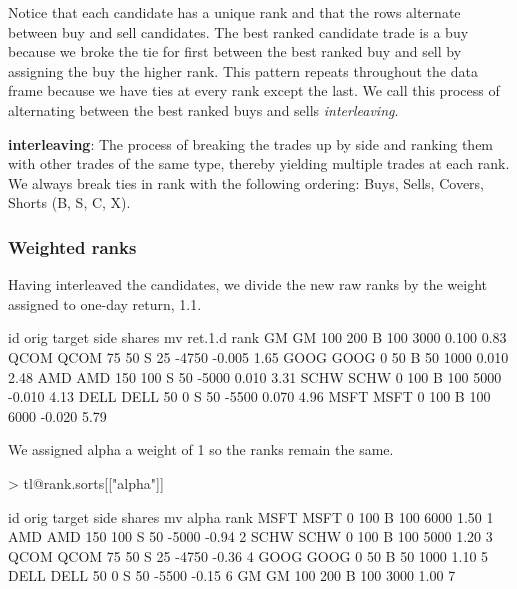 \documentclass{article}
\begin{document}
Notice that each candidate has a unique rank and that the rows
alternate between buy and sell candidates.  The best ranked candidate
trade is a buy because we broke the tie for first between the best
ranked buy and sell by assigning the buy the higher rank.  This
pattern repeats throughout the data frame because we have ties at
every rank except the last.  We call this process of alternating
between the best ranked buys and sells \emph{interleaving}.

\begin{description}

\item{\bf{interleaving}}: The process of breaking the trades up by
  side and ranking them with other trades of the same type, thereby
  yielding multiple trades at each rank.  We always break ties in rank
  with the following ordering: Buys, Sells, Covers, Shorts (B, S, C,
  X).

\end{description}

\subsubsection{Weighted ranks}
\label{lo weighted ranks}

Having interleaved the candidates, we divide the new raw ranks by the
weight assigned to one-day return, 1.1.

\begin{Schunk}
\begin{Soutput}
       id orig target side shares    mv ret.1.d rank
GM     GM  100    200    B    100  3000   0.100 0.83
QCOM QCOM   75     50    S     25 -4750  -0.005 1.65
GOOG GOOG    0     50    B     50  1000   0.010 2.48
AMD   AMD  150    100    S     50 -5000   0.010 3.31
SCHW SCHW    0    100    B    100  5000  -0.010 4.13
DELL DELL   50      0    S     50 -5500   0.070 4.96
MSFT MSFT    0    100    B    100  6000  -0.020 5.79
\end{Soutput}
\end{Schunk}

We assigned alpha a weight of 1 so the ranks remain the same.  

\begin{Schunk}
\begin{Sinput}
> tl@rank.sorts[["alpha"]]
\end{Sinput}
\begin{Soutput}
       id orig target side shares    mv alpha rank
MSFT MSFT    0    100    B    100  6000  1.50    1
AMD   AMD  150    100    S     50 -5000 -0.94    2
SCHW SCHW    0    100    B    100  5000  1.20    3
QCOM QCOM   75     50    S     25 -4750 -0.36    4
GOOG GOOG    0     50    B     50  1000  1.10    5
DELL DELL   50      0    S     50 -5500 -0.15    6
GM     GM  100    200    B    100  3000  1.00    7
\end{Soutput}
\end{Schunk}
\end{document}
